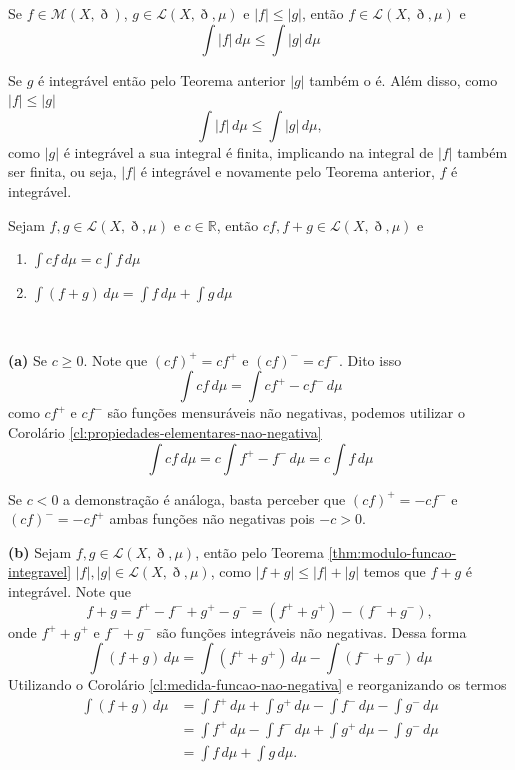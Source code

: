 \documentclass[a4paper, 11pt]{book}
\theoremstyle{definition}
\newcommand{\bR}{\mathbb{R}}
\newcommand{\cM}{\mathcal{M}}
\newcommand{\cL}{\mathcal{L}}
\begin{document}
\begin{cbox} \label{cl:g-implica-f-integravel}
    Se $f \in \cM(X,\eth)$, $g \in \cL(X,\eth,\mu)$ e $|f| \leqslant |g|$, então $f \in \cL(X,\eth,\mu)$ e 
    \[
        \int |f| \,d\mu \leqslant \int |g| \,d\mu
    \]
\end{cbox}
\begin{prf}
    Se $g$ é integrável então pelo Teorema anterior $|g|$ também o é.
    Além disso, como $|f| \leqslant |g|$
    \[
        \int |f| \,d\mu \leqslant \int |g| \,d\mu,
    \]
    como $|g|$ é integrável a sua integral é finita, implicando na integral de $|f|$ também ser finita, ou seja, $|f|$ é integrável e novamente pelo Teorema anterior, $f$ é integrável.
\end{prf}

\begin{tbox} \label{thm:operacoes-elementares-integral}
    Sejam $f, g \in \cL(X,\eth,\mu)$ e $c \in \bR$, então $cf, f + g \in \cL(X,\eth,\mu)$ e 
    \begin{enumerate}[leftmargin=*, label=\textbf{(\alph*)}]
        \item $\displaystyle \int cf \, d\mu = c \int f \,d \mu$
        \item $\displaystyle \int (f + g) \, d\mu = \int f \,d \mu + \int g \, d\mu$
    \end{enumerate}
\end{tbox}
\begin{prf}
    ~

    \textbf{(a)} Se $c \geqslant 0$.
    Note que $(cf)^+ = c f^+$ e $(cf)^- = cf^-$. Dito isso
    \[
        \int cf \,d\mu = \int cf^+ - cf^- \,d\mu 
    \]
    como $cf^+$ e $cf^-$ são funções mensuráveis não negativas, podemos utilizar o Corolário \ref{cl:propiedades-elementares-nao-negativa}
    \[
        \int cf \,d\mu =  c \int f^+ - f^- \,d\mu = c \int f\,d\mu
    \]

    Se $c < 0$ a demonstração é análoga, basta perceber que $(cf)^+ = -c f^-$ e $(cf)^- = -cf^+$ ambas funções não negativas pois $-c > 0$.

    \textbf{(b)} Sejam $f, g \in \cL(X,\eth,\mu)$, então pelo Teorema \ref{thm:modulo-funcao-integravel} $|f|, |g| \in \cL(X,\eth,\mu)$, como $| f + g| \leqslant |f| + |g|$ temos que $f + g$ é integrável. Note que
    \[
        f + g = f^+ - f^- + g^+ - g^- = (f^+ + g^+) - (f^- + g^-),
    \]
    onde $f^+ + g^+$ e $f^- + g^-$ são funções integráveis não negativas. Dessa forma
    \[
        \int (f + g)\,d\mu = \int (f^+ + g^+)\,d\mu - \int (f^- + g^-)\,d\mu
    \]
    Utilizando o Corolário \ref{cl:medida-funcao-nao-negativa} e reorganizando os termos
    \[
        \begin{aligned}
            \int (f + g)\,d\mu &= \int f^+ \,d\mu + \int g^+\,d\mu - \int f^- \,d\mu  -\int g^-\,d\mu\\
            &= \int f^+ \,d\mu  - \int f^- \,d\mu + \int g^+ \,d\mu  - \int g^- \,d\mu\\
            &= \int f \,d\mu + \int g \,d\mu.
        \end{aligned}
    \] 
\end{prf}
\end{document}
